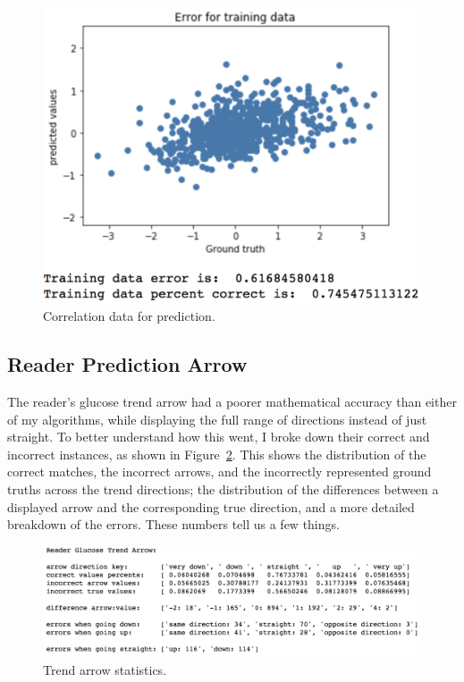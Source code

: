 \begin{figure}[ht]
\centering\includegraphics[width=1.0\linewidth]{images/graph8.png}
\caption{Correlation data for prediction.}
\label{fig:graph8}
\end{figure}

\subsection{Reader Prediction Arrow}
The reader’s glucose trend arrow had a poorer mathematical accuracy than either of my algorithms, while displaying the full range of directions instead of just straight. To better understand how this went, I broke down their correct and incorrect instances, as shown in Figure~\ref{fig:graph9}. This shows the distribution of the correct matches, the incorrect arrows, and the incorrectly represented ground truths across the trend directions; the distribution of the differences between a displayed arrow and the corresponding true direction, and a more detailed breakdown of the errors. These numbers tell us a few things.

\begin{figure}[h]
\centering\includegraphics[width=1.0\linewidth]{images/graph9.png}
\caption{Trend arrow statistics.}
\label{fig:graph9}
\end{figure}

